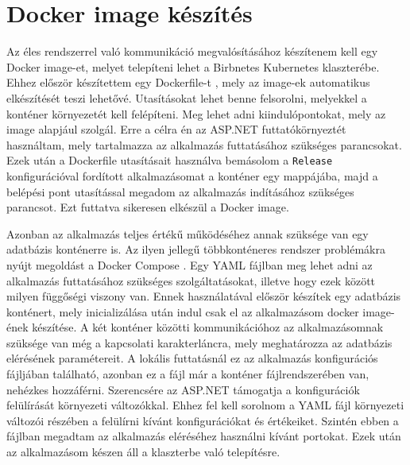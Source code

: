 \chapter{Docker image készítés}
\label{chapt:birdnetes-kubernetes}
Az éles rendszerrel való kommunikáció megvalósításához készítenem kell egy Docker image-et, melyet telepíteni lehet a Birbnetes Kubernetes klaszterébe.
Ehhez először készítettem egy Dockerfile-t \cite{dockerfile}, mely az image-ek automatikus elkészítését teszi lehetővé.
Utasításokat lehet benne felsorolni, melyekkel a konténer környezetét kell felépíteni.
Meg lehet adni kiindulópontokat, mely az image alapjául szolgál.
Erre a célra én az ASP.NET futtatókörnyeztét használtam, mely tartalmazza az alkalmazás futtatásához szükséges parancsokat.
Ezek után a Dockerfile utasításait használva bemásolom a \verb+Release+ konfigurációval fordított alkalmazásomat a konténer egy mappájába, 
majd a belépési pont utasítással megadom az alkalmazás indításához szükséges parancsot.
Ezt futtatva sikeresen elkészül a Docker image.

Azonban az alkalmazás teljes értékű működéséhez annak szüksége van egy adatbázis konténerre is.
Az ilyen jellegű többkonténeres rendszer problémákra nyújt megoldást a Docker Compose \cite{docker-compose}.
Egy YAML fájlban meg lehet adni az alkalmazás futtatásához szükséges szolgáltatásokat, illetve hogy ezek között milyen függőségi viszony van.
Ennek használatával először készítek egy adatbázis konténert, mely inicializálása után indul csak el az alkalmazásom docker image-ének készítése.
A két konténer közötti kommunikációhoz az alkalmazásomnak szüksége van még a kapcsolati karakterláncra, mely meghatározza az adatbázis elérésének paramétereit.
A lokális futtatásnál ez az alkalmazás konfigurációs fájljában található, azonban ez a fájl már a konténer fájlrendszerében van, nehézkes hozzáférni.
Szerencsére az ASP.NET támogatja a konfigurációk felülírását környezeti változókkal.
Ehhez fel kell sorolnom a YAML fájl környezeti változói részében a felülírni kívánt konfigurációkat és értékeiket.
Szintén ebben a fájlban megadtam az alkalmazás eléréséhez használni kívánt portokat.
Ezek után az alkalmazásom készen áll a klaszterbe való telepítésre.